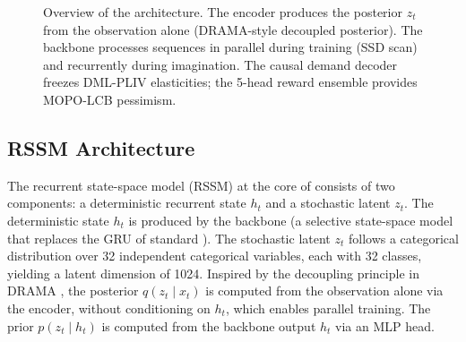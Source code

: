 \begin{figure}[t]
{%
}
\caption{Overview of the \dreamprice{} architecture. The encoder produces the posterior $z_t$ from the observation alone (DRAMA-style decoupled posterior). The \mamba{} backbone processes sequences in parallel during training (SSD scan) and recurrently during imagination. The causal demand decoder freezes DML-PLIV elasticities; the 5-head reward ensemble provides MOPO-LCB pessimism.}
\label{fig:architecture}
\end{figure}

\subsection{RSSM Architecture}

The recurrent state-space model (RSSM) at the core of \dreamprice{} consists of two components: a deterministic recurrent state $h_t$ and a stochastic latent $z_t$. The deterministic state $h_t$ is produced by the backbone (a \mamba{} selective state-space model that replaces the GRU of standard \dreamer{} \citep{hafner2023dreamerv3}). The stochastic latent $z_t$ follows a categorical distribution over 32 independent categorical variables, each with 32 classes, yielding a latent dimension of 1024. Inspired by the decoupling principle in DRAMA \citep{rajbhandari2024drama}, the posterior $q(z_t \mid x_t)$ is computed from the observation alone via the encoder, without conditioning on $h_t$, which enables parallel training. The prior $p(z_t \mid h_t)$ is computed from the backbone output $h_t$ via an MLP head.

